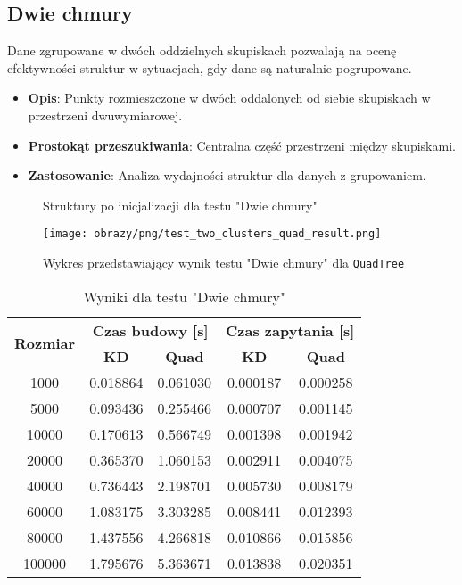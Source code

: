 \documentclass[12pt]{article}
\begin{document}
\newpage
\subsection{Dwie chmury}
Dane zgrupowane w dwóch oddzielnych skupiskach pozwalają na ocenę efektywności struktur w sytuacjach, gdy dane są naturalnie pogrupowane.
\begin{itemize}
    \item \textbf{Opis}: Punkty rozmieszczone w dwóch oddalonych od siebie skupiskach w przestrzeni dwuwymiarowej.
    \item \textbf{Prostokąt przeszukiwania}: Centralna część przestrzeni między skupiskami.
    \item \textbf{Zastosowanie}: Analiza wydajności struktur dla danych z grupowaniem.
\end{itemize}



\begin{figure}[h]
    \centering
    \qquad
    \caption{Struktury po inicjalizacji dla testu "Dwie chmury"}%
    \label{fig:two_clusters}%
\end{figure}

\begin{figure}[h]
    \centering
    \texttt{[image: obrazy/png/test\_two\_clusters\_quad\_result.png]}
    \caption{Wykres przedstawiający wynik testu "Dwie chmury" dla \texttt{QuadTree}}
    \label{fig:two_clusters_test_quad_result}
\end{figure}

\begin{table}[h]
\centering
\caption{Wyniki dla testu "Dwie chmury"}
\label{tab:test_two_clusters}
\begin{tabular}{ccccc}  %
\toprule
\multirow{2}{*}{\textbf{Rozmiar}} & \multicolumn{2}{c}{\textbf{Czas budowy [s]}} & \multicolumn{2}{c}{\textbf{Czas zapytania [s]}} \\
\cmidrule(lr){2-3} \cmidrule(lr){4-5}
 & \textbf{KD} & \textbf{Quad} & \textbf{KD} & \textbf{Quad} \\
\midrule
1000   & 0.018864 & 0.061030 & 0.000187 & 0.000258 \\
5000   & 0.093436 & 0.255466 & 0.000707 & 0.001145 \\
10000  & 0.170613 & 0.566749 & 0.001398 & 0.001942 \\
20000  & 0.365370 & 1.060153 & 0.002911 & 0.004075 \\
40000  & 0.736443 & 2.198701 & 0.005730 & 0.008179 \\
60000  & 1.083175 & 3.303285 & 0.008441 & 0.012393 \\
80000  & 1.437556 & 4.266818 & 0.010866 & 0.015856 \\
100000 & 1.795676 & 5.363671 & 0.013838 & 0.020351 \\
\bottomrule
\end{tabular}
\end{table}
\end{document}
